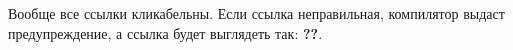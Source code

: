 
Вообще все ссылки кликабельны. Если ссылка неправильная, компилятор выдаст предупреждение, а ссылка будет выглядеть так: \textbf{??}.

